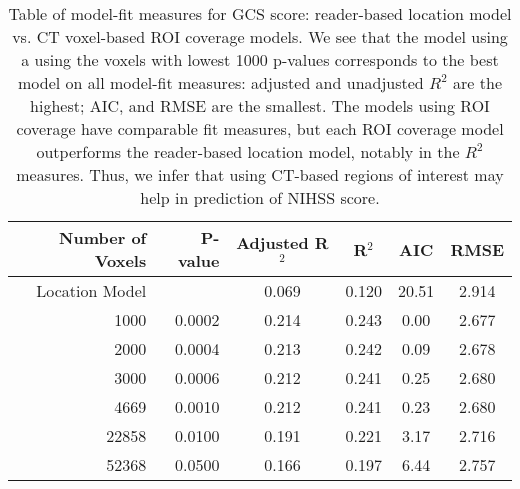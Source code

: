 \begin{table}[H]
\centering
\begin{tabular}{rrcccc}
  \hline
{\bf Number of Voxels} & {\bf P-value} & {\bf Adjusted R$^2$} & {\bf R$^2$} & {\bf AIC} & {\bf RMSE} \\ 
  \hline
Location Model &  & 0.069 & 0.120 & 20.51 & 2.914 \\ 
  1000 & 0.0002 & 0.214 & 0.243 & 0.00 & 2.677 \\ 
  2000 & 0.0004 & 0.213 & 0.242 & 0.09 & 2.678 \\ 
  3000 & 0.0006 & 0.212 & 0.241 & 0.25 & 2.680 \\ 
  4669 & 0.0010 & 0.212 & 0.241 & 0.23 & 2.680 \\ 
  22858 & 0.0100 & 0.191 & 0.221 & 3.17 & 2.716 \\ 
  52368 & 0.0500 & 0.166 & 0.197 & 6.44 & 2.757 \\ 
   \hline
\end{tabular}
\caption{Table of model-fit measures for GCS score: reader-based location model vs. CT voxel-based ROI coverage models. We see that the model using a using the voxels with lowest 1000 p-values corresponds to the best model on all model-fit measures: adjusted and unadjusted $R^2$ are the highest; AIC, and RMSE are the smallest.  The models using ROI coverage have comparable fit measures, but each ROI coverage model outperforms the reader-based location model, notably in the $R^2$ measures.  Thus, we infer that using CT-based regions of interest may help in prediction of NIHSS score.} 
\label{t:gcs}
\end{table}
